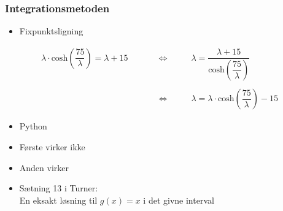 \begin{frame}
\frametitle{Integrationsmetoden}
\center
%
\begin{itemize}
\item Fixpunktsligning
\end{itemize}
%
\begin{align*}
\lambda \cdot \text{cosh} \left( \dfrac{75}{\lambda} \right) =\lambda+15 
\phantom{HHH} & \Leftrightarrow \phantom{HHH}
\lambda=\dfrac{\lambda+15}{\text{cosh} \left( \dfrac{75}{\lambda} \right) } \\
\\
 \phantom{HHH} & \Leftrightarrow \phantom{HHH}
\lambda = \lambda \cdot \text{cosh} \left( \dfrac{75}{\lambda} \right)-15  
\end{align*}
\begin{itemize}
\item Python
\item Første virker ikke 
\item Anden virker
\item Sætning 13 i Turner: \\ En eksakt løsning til $g(x)=x$ i det givne interval
\end{itemize}
\end{frame}